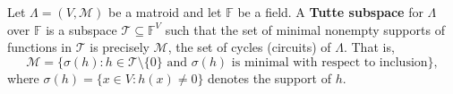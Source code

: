 Let $\Lambda = (V, \mathcal{M})$ be a matroid and let $\mathbb{F}$ be a field. A \textbf{Tutte subspace} for $\Lambda$ over $\mathbb{F}$ is a subspace $\mathcal{T} \subseteq \mathbb{F}^V$ such that the set of minimal nonempty supports of functions in $\mathcal{T}$ is precisely $\mathcal{M}$, the set of cycles (circuits) of $\Lambda$. That is,
$$\mathcal{M} = \{\sigma(h) : h \in \mathcal{T} \setminus \{0\} \text{ and } \sigma(h) \text{ is minimal with respect to inclusion}\},$$
where $\sigma(h) = \{x \in V : h(x) \neq 0\}$ denotes the support of $h$.
